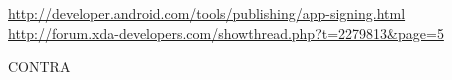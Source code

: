 \url{http://developer.android.com/tools/publishing/app-signing.html}\newline
\url{http://forum.xda-developers.com/showthread.php?t=2279813&page=5}\newline

CONTRA\newline
